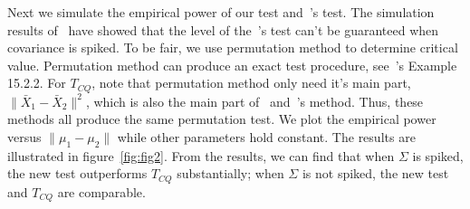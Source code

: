 \documentclass[review]{elsarticle}
\theoremstyle{plain}
\theoremstyle{definition}
\theoremstyle{remark}
\begin{document}




Next we simulate the empirical power of our test and~\cite{Chen2010A}'s test.
The simulation results of~\cite{Ma2015A} have showed that the level of the~\cite{Chen2010A}'s test can't be guaranteed when covariance is spiked.
To be fair, we use permutation method to determine critical value.
Permutation method can produce an exact test procedure, see~\cite{Lehmann}'s Example 15.2.2.\@
For $T_{CQ}$, note that permutation method only need it's main part, $\|\bar{X}_1-\bar{X}_2\|^2$, which is also the main part of~\cite{Bai1996Efiect} and~\cite{Ma2015A}'s method.
Thus, these methods all produce the same permutation test.
We plot the empirical power versus $\|\mu_1-\mu_2\|$ while other parameters hold constant.
The results are illustrated in figure~\ref{fig:fig2}.
From the results, we can find that when $\Sigma$ is spiked, the new test outperforms $T_{CQ}$ substantially; when $\Sigma$ is not spiked, the new test and $T_{CQ}$ are comparable.
\end{document}
